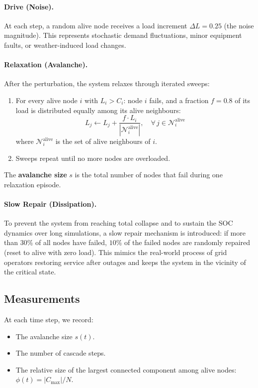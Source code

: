 \documentclass[12pt,a4paper]{article}
\begin{document}
\paragraph{Drive (Noise).}
At each step, a random alive node receives a load increment $\Delta L = 0.25$ (the noise magnitude). This represents stochastic demand fluctuations, minor equipment faults, or weather-induced load changes.

\paragraph{Relaxation (Avalanche).}
After the perturbation, the system relaxes through iterated sweeps:
\begin{enumerate}[leftmargin=2em]
  \item For every alive node $i$ with $L_i > C_i$: node $i$ fails, and a fraction $f = 0.8$ of its load is distributed equally among its alive neighbours:
  \begin{equation}
    L_j \leftarrow L_j + \frac{f \cdot L_i}{|\mathcal{N}_i^{\text{alive}}|}, \quad \forall\, j \in \mathcal{N}_i^{\text{alive}}
    \label{eq:redistribution}
  \end{equation}
  where $\mathcal{N}_i^{\text{alive}}$ is the set of alive neighbours of $i$.
  \item Sweeps repeat until no more nodes are overloaded.
\end{enumerate}

The \textbf{avalanche size} $s$ is the total number of nodes that fail during one relaxation episode.

\paragraph{Slow Repair (Dissipation).}
To prevent the system from reaching total collapse and to sustain the SOC dynamics over long simulations, a slow repair mechanism is introduced: if more than $30\%$ of all nodes have failed, $10\%$ of the failed nodes are randomly repaired (reset to alive with zero load). This mimics the real-world process of grid operators restoring service after outages and keeps the system in the vicinity of the critical state.

\subsection{Measurements}

At each time step, we record:
\begin{itemize}[leftmargin=2em]
  \item The avalanche size $s(t)$.
  \item The number of cascade steps.
  \item The relative size of the largest connected component among alive nodes: $\phi(t) = |C_{\max}| / N$.
\end{itemize}
\end{document}

